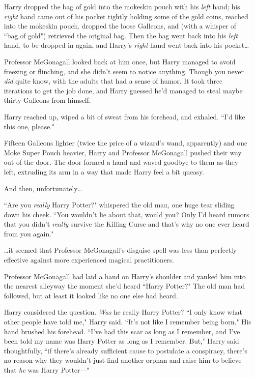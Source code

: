 Harry dropped the bag of gold into the mokeskin pouch with his \emph{left} hand; his \emph{right} hand came out of his pocket tightly holding some of the gold coins, reached into the mokeskin pouch, dropped the loose Galleons, and (with a whisper of ``bag of gold") retrieved the original bag. Then the bag went back into his \emph{left} hand, to be dropped in again, and Harry's \emph{right} hand went back into his pocket{\ldots}

Professor McGonagall looked back at him once, but Harry managed to avoid freezing or flinching, and she didn't seem to notice anything. Though you never \emph{did} quite know, with the adults that had a sense of humor. It took three iterations to get the job done, and Harry guessed he'd managed to steal maybe thirty Galleons from himself.

Harry reached up, wiped a bit of sweat from his forehead, and exhaled. ``I'd like this one, please."

Fifteen Galleons lighter (twice the price of a wizard's wand, apparently) and one Moke Super Pouch  heavier, Harry and Professor McGonagall pushed their way out of the door. The door formed a hand and waved goodbye to them as they left, extruding its arm in a way that made Harry feel a bit queasy.

And then, unfortunately{\ldots}

``Are you \emph{really} Harry Potter?" whispered the old man, one huge tear sliding down his cheek. ``You wouldn't lie about that, would you? Only I'd heard rumors that you didn't \emph{really} survive the Killing Curse and that's why no one ever heard from you again."

{\ldots}it seemed that Professor McGonagall's disguise spell was less than perfectly effective against more experienced magical practitioners.

Professor McGonagall had laid a hand on Harry's shoulder and yanked him into the nearest alleyway the moment she'd heard ``Harry Potter?" The old man had followed, but at least it looked like no one else had heard.

Harry considered the question. \emph{Was} he really Harry Potter? ``I only know what other people have told me," Harry said. ``It's not like I remember being born." His hand brushed his forehead. ``I've had this scar as long as I remember, and I've been told my name was Harry Potter as long as I remember. But," Harry said thoughtfully, ``if there's already sufficient cause to postulate a conspiracy, there's no reason why they wouldn't just find another orphan and raise him to believe that \emph{he} was Harry Potter---"

